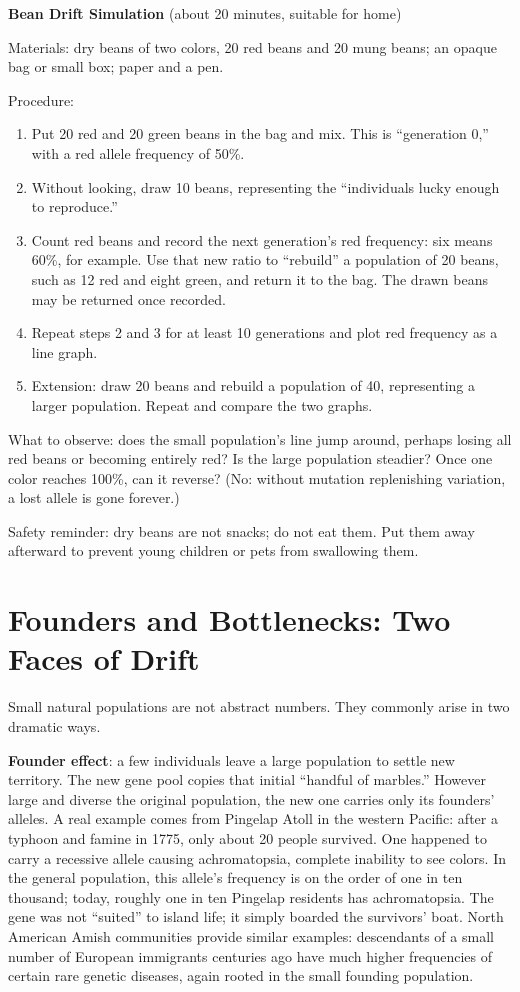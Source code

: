 \begin{shiyan}
\textbf{Bean Drift Simulation} (about 20 minutes, suitable for home)

Materials: dry beans of two colors, 20 red beans and 20 mung beans; an opaque bag or small box; paper and a pen.

Procedure:
\begin{enumerate}[itemsep=1pt]
\item Put 20 red and 20 green beans in the bag and mix. This is ``generation 0,'' with a red allele frequency of 50\%.
\item Without looking, draw 10 beans, representing the ``individuals lucky enough to reproduce.''
\item Count red beans and record the next generation's red frequency: six means 60\%, for example. Use that new ratio to ``rebuild'' a population of 20 beans, such as 12 red and eight green, and return it to the bag. The drawn beans may be returned once recorded.
\item Repeat steps 2 and 3 for at least 10 generations and plot red frequency as a line graph.
\item Extension: draw 20 beans and rebuild a population of 40, representing a larger population. Repeat and compare the two graphs.
\end{enumerate}

What to observe: does the small population's line jump around, perhaps losing all red beans or becoming entirely red? Is the large population steadier? Once one color reaches 100\%, can it reverse? (No: without mutation replenishing variation, a lost allele is gone forever.)

Safety reminder: dry beans are not snacks; do not eat them. Put them away afterward to prevent young children or pets from swallowing them.
\end{shiyan}

\section{Founders and Bottlenecks: Two Faces of Drift}

Small natural populations are not abstract numbers. They commonly arise in two dramatic ways.

\textbf{Founder effect}: a few individuals leave a large population to settle new territory. The new gene pool copies that initial ``handful of marbles.'' However large and diverse the original population, the new one carries only its founders' alleles. A real example comes from Pingelap Atoll in the western Pacific: after a typhoon and famine in 1775, only about 20 people survived. One happened to carry a recessive allele causing achromatopsia, complete inability to see colors. In the general population, this allele's frequency is on the order of one in ten thousand; today, roughly one in ten Pingelap residents has achromatopsia. The gene was not ``suited'' to island life; it simply boarded the survivors' boat. North American Amish communities provide similar examples: descendants of a small number of European immigrants centuries ago have much higher frequencies of certain rare genetic diseases, again rooted in the small founding population.

